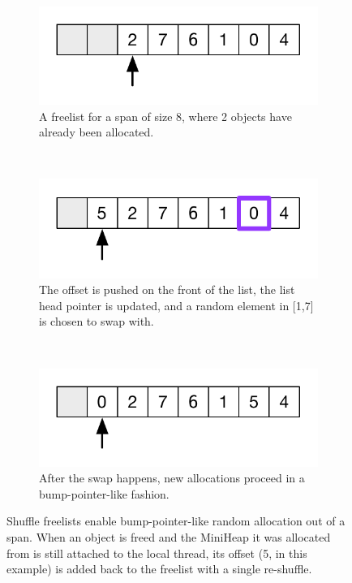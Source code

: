 \begin{figure}[!t]
  \begin{subfigure}[t]{.4\textwidth}
    \centering
    \includegraphics[width=\textwidth]{figures/shuffle-freelist_a}
    \caption{A freelist for a span of size 8, where 2 objects have
      already been allocated.}
  \end{subfigure}%
  ~

  \begin{subfigure}[t]{.4\textwidth}
    \centering
    \includegraphics[width=\textwidth]{figures/shuffle-freelist_b}
    \caption{The offset is pushed on the front of the list, the list
      head pointer is updated, and a random element in [1,7] is chosen
      to swap with.}
  \end{subfigure}%
  ~

  \begin{subfigure}[t]{.4\textwidth}
    \centering
    \includegraphics[width=\textwidth]{figures/shuffle-freelist_c}
    \caption{After the swap happens, new allocations proceed in a
      bump-pointer-like fashion.}
  \end{subfigure}
  \caption{Shuffle freelists enable bump-pointer-like random
    allocation out of a span.  When an object is freed and the
    MiniHeap it was allocated from is still attached to the local
    thread, its offset (5, in this example) is added back to the
    freelist with a single re-shuffle.}
  \label{fig:shuffle-freelists}
\end{figure}

